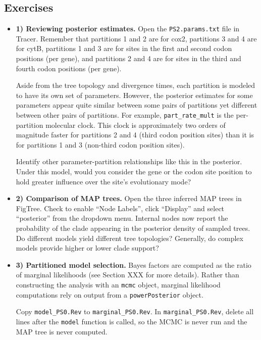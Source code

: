\subsection{Exercises}
\begin{itemize}

\item {\bf 1) Reviewing posterior estimates.} Open the {\tt PS2.params.txt} file in Tracer. Remember that partitions 1 and 2 are for cox2, partitions 3 and 4 are for cytB, partitions 1 and 3 are for sites in the first and second codon positions (per gene), and partitions 2 and 4 are for sites in the third and fourth codon positions (per gene).

Aside from the tree topology and divergence times, each partition is modeled to have its own set of parameters.
However, the posterior estimates for some parameters appear quite similar between some pairs of partitions yet different between other pairs of partitions.
For example, {\tt part\_rate\_mult} is the per-partition molecular clock.
This clock is approximately two orders of magnitude faster for partitions 2 and 4 (third codon position sites) than it is for partitions 1 and 3 (non-third codon position sites).

Identify other parameter-partition relationships like this in the posterior.
Under this model, would you consider the gene or the codon site position to hold greater influence over the site's evolutionary mode?

\item {\bf 2) Comparison of MAP trees.} Open the three inferred MAP trees in FigTree.
Check to enable ``Node Labels'', click ``Display'' and select ``posterior'' from the dropdown menu.
Internal nodes now report the probability of the clade appearing in the posterior density of sampled trees.
Do different models yield different tree topologies?
Generally, do complex models provide higher or lower clade support?

\item {\bf 3) Partitioned model selection.}
Bayes factors are computed as the ratio of marginal likelihoods (see Section XXX for more details).
Rather than constructing the analysis with an {\tt mcmc} object, marginal likelihood computations rely on output from a {\tt powerPosterior} object.

Copy {\tt model\_PS0.Rev} to {\tt marginal\_PS0.Rev}.
In {\tt marginal\_PS0.Rev}, delete all lines after the {\tt model} function is called, so the MCMC is never run and the MAP tree is never computed.


\end{itemize}
